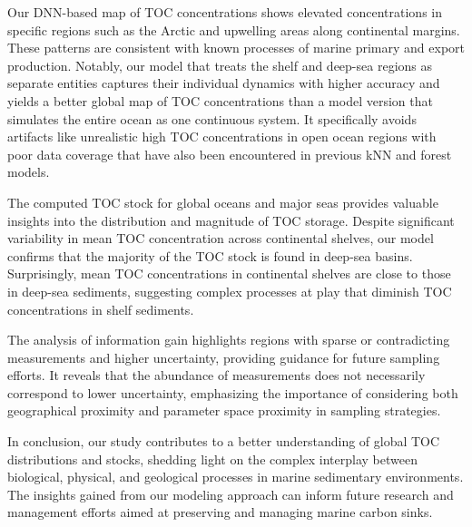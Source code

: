 \documentclass[journal abbreviation, manuscript]{copernicus}
\begin{document}
Our DNN-based map of TOC concentrations shows elevated concentrations in specific regions such as the Arctic and upwelling areas along continental margins. These patterns are consistent with known processes of marine primary and export production. Notably, our model that treats the shelf and deep-sea regions as separate entities captures their individual dynamics with higher accuracy and yields a better global map of TOC concentrations than a model version that simulates the entire ocean as one continuous system. It specifically avoids  artifacts like unrealistic high TOC concentrations in  open ocean regions with poor data coverage that have also been encountered in previous kNN and forest models.

The computed TOC stock for global oceans and major seas provides valuable insights into the distribution and magnitude of TOC storage. Despite significant variability in mean TOC concentration across continental shelves, our model confirms that the majority of the TOC stock is found in deep-sea basins. Surprisingly, mean TOC concentrations in continental shelves are close to those in deep-sea sediments, suggesting complex processes at play that diminish TOC concentrations in shelf sediments.

The analysis of information gain highlights regions with sparse or contradicting measurements and higher uncertainty, providing guidance for future sampling efforts. It reveals that the abundance of measurements does not necessarily correspond to lower uncertainty, emphasizing the importance of considering both geographical proximity and parameter space proximity in sampling strategies.

In conclusion, our study contributes to a better understanding of global TOC distributions and stocks, shedding light on the complex interplay between biological, physical, and geological processes in marine sedimentary environments. The insights gained from our modeling approach can inform future research and management efforts aimed at preserving and managing marine carbon sinks.





\appendix

\makeatletter
\def\@seccntformat#1{\@ifundefined{#1@cntformat}%
   {\csname the#1\endcsname\space}%
   {\csname #1@cntformat\endcsname}}%
\newcommand\section@cntformat{\appendixname\thesection.\space} %
\makeatother
\renewcommand{\thesection}{S\arabic{section}}
\end{document}

